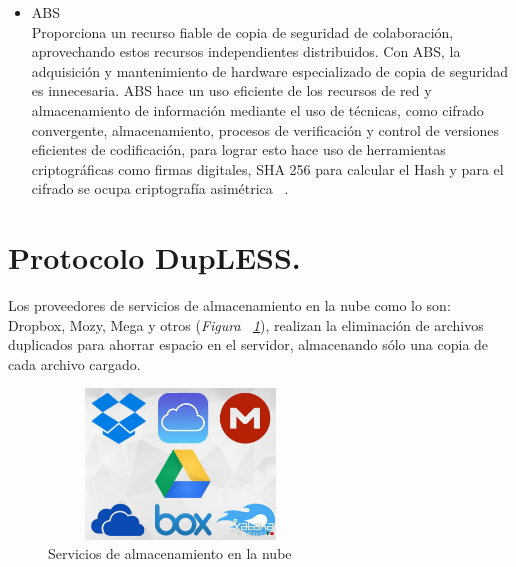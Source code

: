 \begin{itemize}

\item ABS\\

Proporciona un recurso fiable de copia de seguridad de colaboración, aprovechando estos recursos independientes distribuidos. Con ABS, la adquisición y mantenimiento de hardware especializado de copia de seguridad es innecesaria. ABS hace un uso eficiente de los recursos de red y almacenamiento de información mediante el uso de técnicas, como cifrado convergente, almacenamiento, procesos de verificación y control de versiones eficientes de codificación, para lograr esto hace uso de herramientas criptográficas como firmas digitales, SHA 256 para calcular el Hash y para el cifrado se ocupa criptografía asimétrica ~\cite{abs}.

\end{itemize}



\section{Protocolo DupLESS. }
Los proveedores de servicios de almacenamiento en la nube como lo son: Dropbox, Mozy, Mega y otros (\textit{Figura ~\ref{fig:3-1-0}}), realizan la eliminación de archivos duplicados para ahorrar espacio en el servidor, almacenando sólo una copia de cada archivo cargado. \\

\begin{figure}[H]
\centering
\includegraphics[width=7cm, height=4cm]{./images/servicios_nube.jpg}
\caption{Servicios de almacenamiento en la nube}
\label{fig:3-1-0}
\end{figure}



